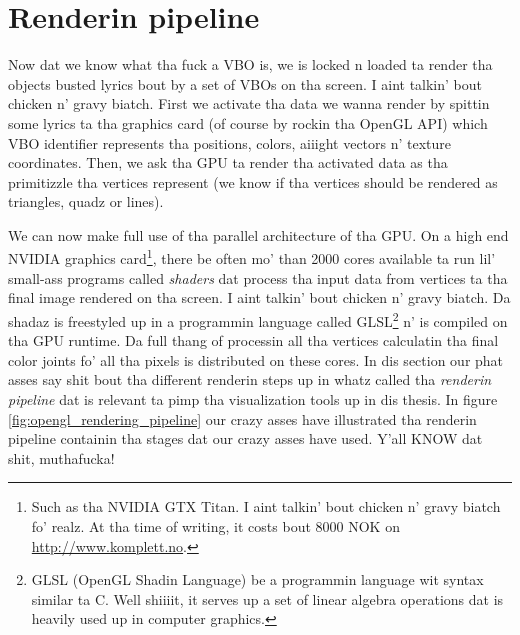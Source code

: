 \section{Renderin pipeline}
\label{sec:opengl_rendering_pipeline}
Now dat we know what tha fuck a VBO is, we is locked n loaded ta render tha objects busted lyrics bout by a set of VBOs on tha screen. I aint talkin' bout chicken n' gravy biatch. First we activate tha data we wanna render by spittin some lyrics ta tha graphics card (of course by rockin tha OpenGL API) which VBO identifier represents tha positions, colors, aiiight vectors n' texture coordinates. Then, we ask tha GPU ta render tha activated data as tha primitizzle tha vertices represent (we know if tha vertices should be rendered as triangles, quadz or lines).

We can now make full use of tha parallel architecture of tha GPU. On a high end NVIDIA graphics card\footnote{Such as tha NVIDIA GTX Titan. I aint talkin' bout chicken n' gravy biatch fo' realz. At tha time of writing, it costs bout 8000 NOK on \url{http://www.komplett.no}.}, there be often mo' than 2000 cores available ta run lil' small-ass programs called \textit{shaders} dat process tha input data from vertices ta tha final image rendered on tha screen. I aint talkin' bout chicken n' gravy biatch. Da shadaz is freestyled up in a programmin language called GLSL\footnote{GLSL (OpenGL Shadin Language) be a programmin language wit syntax similar ta C. Well shiiiit, it serves up a set of linear algebra operations dat is heavily used up in computer graphics.} n' is compiled on tha GPU runtime. Da full thang of processin all tha vertices calculatin tha final color joints fo' all tha pixels is distributed on these cores. In dis section our phat asses say shit bout tha different renderin steps up in whatz called tha \textit{renderin pipeline} dat is relevant ta pimp tha visualization tools up in dis thesis. In figure \ref{fig:opengl_rendering_pipeline} our crazy asses have illustrated tha renderin pipeline containin tha stages dat our crazy asses have used. Y'all KNOW dat shit, muthafucka! 
